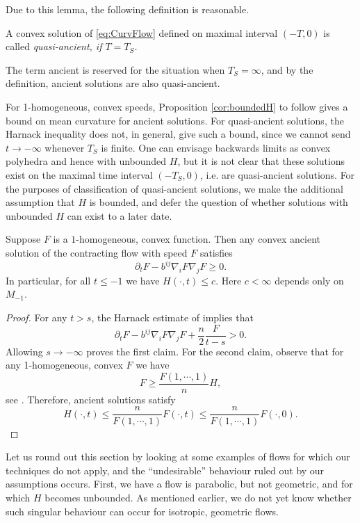 \documentclass{amsart}
\begin{document}
Due to this lemma, the following definition is reasonable.

\begin{definition}
A convex solution of \eqref{eq:CurvFlow} defined on maximal interval $(-T,0)$ is called \it{quasi-ancient}, if $T=T_S$.
\end{definition}

The term ancient is reserved for the situation when \(T_S=\infty\), and by the definition, ancient solutions are also quasi-ancient.

For 1-homogeneous, convex speeds, Proposition \ref{cor:boundedH} to follow gives a bound on mean curvature for ancient solutions. For quasi-ancient solutions, the Harnack inequality does not, in general, give such a bound, since we cannot send \(t \to -\infty\) whenever \(T_S\) is finite. One can envisage backwards limits as convex polyhedra and hence with unbounded \(H\), but it is not clear that these solutions exist on the maximal time interval \((-T_S, 0)\), i.e. are quasi-ancient solutions. For the purposes of classification of quasi-ancient solutions, we make the additional assumption that \(H\) is bounded, and defer the question of whether solutions with unbounded \(H\) can exist to a later date.

\begin{proposition}
\label{cor:boundedH}

Suppose $F$ is a \(1\)-homogeneous, convex function. Then any convex ancient solution of the contracting flow with speed $F$ satisfies
\[\partial_t F-b^{ij}\nabla_i F \nabla_j F \geq 0.\]
In particular, for all $t\le -1$ we have
$H(\cdot,t)\leq c.$
Here $c<\infty$ depends only on $M_{-1}.$
\end{proposition}

\begin{proof}
For any $t>s$, the  Harnack estimate of \cite[Theorem 1]{bryan2015harnack} implies that
$$\partial_t F-b^{ij}\nabla_i F\nabla_j F+\frac{n}{2}\frac{F}{t-s}>0.$$
Allowing $s\to-\infty$ proves the first claim. For the second claim, observe that for any 1-homogeneous, convex $F$ we have \[F\ge \frac{F(1,\cdots,1)}{n}H,\]
see \cite[Chapter 2]{Gerhardt:/2006}. Therefore, ancient solutions satisfy
\[H(\cdot,t)\leq \frac{n}{F(1,\cdots,1)}F(\cdot,t)\leq \frac{n}{F(1,\cdots,1)}F(\cdot,0). \]
\end{proof}

Let us round out this section by looking at some examples of flows for which our techniques do not apply, and the ``undesirable'' behaviour ruled out by our assumptions occurs. First, we have a flow is parabolic, but not geometric, and for which \(H\) becomes unbounded. As mentioned earlier, we do not yet know whether such singular behaviour can occur for isotropic, geometric flows.
\end{document}
